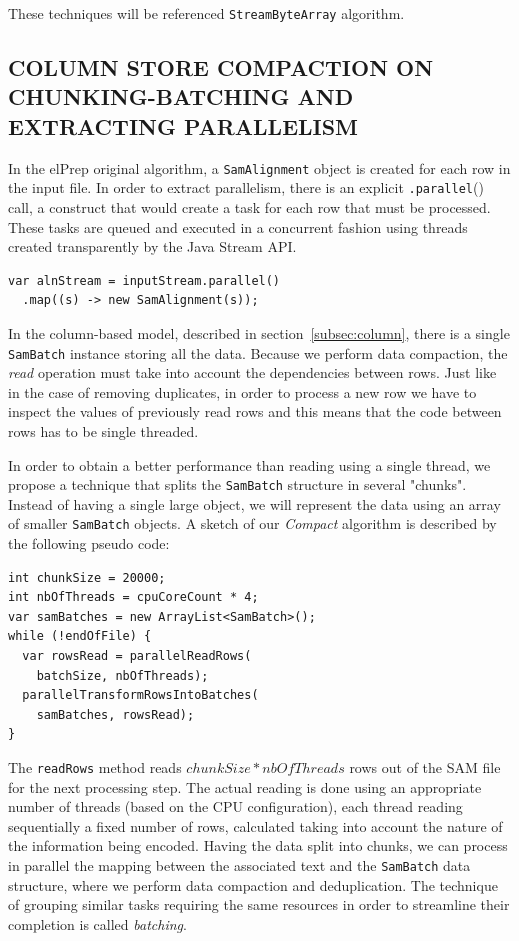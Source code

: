 \documentclass[a4paper,twoside]{article}
\begin{document}
These techniques will be referenced \texttt{StreamByteArray} algorithm.

\subsection{\uppercase{Column Store Compaction on Chunking-Batching and Extracting Parallelism}} 
\label{subsec:batching}

In the elPrep original algorithm, a {\texttt{SamAlignment}} object is created for each row in the input file.
In order to extract parallelism, there is an explicit {\texttt{.parallel}()} call, a construct that would create a task for each row that must be processed.
These tasks are queued and executed in a concurrent fashion using threads created transparently by the Java Stream API.
\begin{verbatim}
var alnStream = inputStream.parallel()
  .map((s) -> new SamAlignment(s));
\end{verbatim}
In the column-based model, described in section~\ref{subsec:column}, there is a single {\texttt{SamBatch}} instance storing all the data.
Because we perform data compaction, the {\textit{read}} operation must take into account the dependencies between rows. Just like in the case of removing duplicates, in order to process a new row we have to inspect the values of previously read rows and this means that the code between rows has to be single threaded.

In order to obtain a better performance than reading using a single thread, we propose a technique that splits the {\texttt{SamBatch}} structure in several "chunks".
Instead of having a single large object, we will represent the data using an array of smaller {\texttt{SamBatch}} objects.
A sketch of our {\textit{Compact}} algorithm is described by the following pseudo code:

\begin{verbatim}
int chunkSize = 20000;
int nbOfThreads = cpuCoreCount * 4;
var samBatches = new ArrayList<SamBatch>();
while (!endOfFile) {
  var rowsRead = parallelReadRows(
    batchSize, nbOfThreads);
  parallelTransformRowsIntoBatches(
    samBatches, rowsRead);
}
\end{verbatim}

The {\texttt{readRows}} method reads $chunkSize * nbOfThreads$ rows out of the SAM file for the next processing step.
The actual reading is done using an appropriate number of threads (based on the CPU configuration), each thread reading sequentially a fixed number of rows, calculated taking into account the nature of the information being encoded.
Having the data split into chunks, we can process in parallel the mapping between the associated text and the {\texttt{SamBatch}} data structure, where we perform data compaction and deduplication.
The technique of grouping similar tasks requiring the same resources in order to streamline their completion is called {\textit{batching}}.
\end{document}
